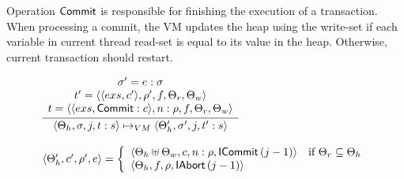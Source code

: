 \documentclass[sigplan, anonymous, review]{acmart}
\theoremstyle{definition}
\newcommand{\C}[1]{\red{\mathsf{#1}}}
\begin{document}
Operation \ensuremath{\C{Commit}} is responsible for finishing the execution of a transaction. When processing a commit, the VM
updates the heap using the write-set if each variable in current thread read-set is equal to its value in the heap.
Otherwise, current transaction should restart.

\[
\begin{array}{l}
  \infer
        {\langle \Theta_h,\sigma,j, t : s \rangle \mapsto_{VM}
         \langle \Theta_h',\sigma',j,t' : s \rangle}
        {\begin{array}{c}
            \sigma' = e : \sigma \\
            t' = \langle \langle exs, c'\rangle, \rho', f, \Theta_r,\Theta_w\rangle\\
            t = \langle \langle exs, \ensuremath{\C{Commit}} : c\rangle,n:\rho,f,\Theta_r,\Theta_w\rangle
         \end{array}} \\ \\
  \langle \Theta_h', c', \rho' , e \rangle
    = \left\{
         \begin{array}{ll}
            \langle \Theta_h \uplus \Theta_w, c, n : \rho, \ensuremath{\C{ICommit}}\,(j-1) \rangle & \text{if }\Theta_r\subseteq \Theta_h\\
            \langle \Theta_h, f, \rho, \ensuremath{\C{IAbort}}\,(j-1) \rangle
         \end{array}
      \right.
\end{array}
\]
\end{document}

